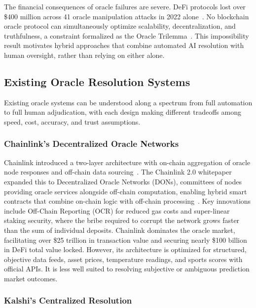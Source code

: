 The financial consequences of oracle failures are severe. DeFi protocols 
lost over \$400 million across 41 oracle manipulation attacks in 2022 
alone~\cite{chainalysis2023oracle}. No blockchain oracle protocol can 
simultaneously optimize scalability, decentralization, and truthfulness, 
a constraint formalized as the Oracle Trilemma~\cite{cong2025oracle}. 
This impossibility result motivates hybrid approaches that combine automated 
AI resolution with human oversight, rather than relying on either alone.

\subsection{Existing Oracle Resolution Systems}

Existing oracle systems can be understood along a spectrum from full automation to full human adjudication, with each design making different tradeoffs among speed, cost, accuracy, and trust assumptions.

\subsubsection{Chainlink's Decentralized Oracle Networks}

Chainlink introduced a two-layer architecture with on-chain aggregation of oracle node responses and off-chain data sourcing~\cite{ellis2017chainlink}. The Chainlink 2.0 whitepaper expanded this to Decentralized Oracle Networks (DONs), committees of nodes providing oracle services alongside off-chain computation, enabling hybrid smart contracts that combine on-chain logic with off-chain processing~\cite{chainlink2021v2}. Key innovations include Off-Chain Reporting (OCR) for reduced gas costs and super-linear staking security, where the bribe required to corrupt the network grows faster than the sum of individual deposits. Chainlink dominates the oracle market, facilitating over \$25 trillion in transaction value and securing nearly \$100 billion in DeFi total value locked. However, its architecture is optimized for structured, objective data feeds, asset prices, temperature readings, and sports scores with official APIs. It is less well suited to resolving subjective or ambiguous prediction market outcomes.

\subsubsection{Kalshi's Centralized Resolution}

